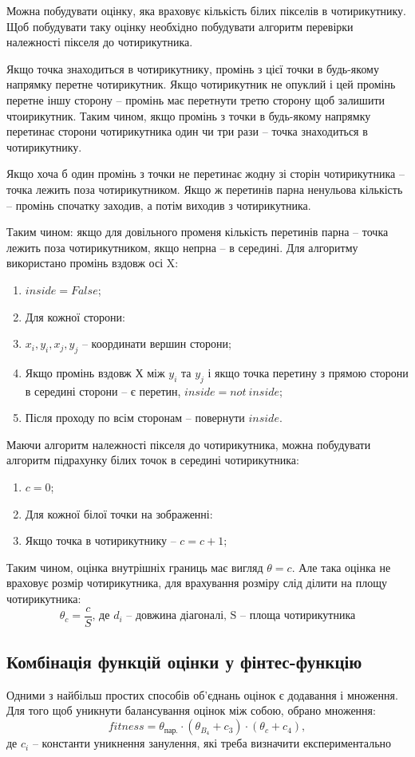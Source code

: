 \documentclass[a4paper,14pt]{report}
\begin{document}
Можна побудувати оцінку, яка враховує кількість білих пікселів в чотирикутнику. Щоб побудувати таку оцінку необхідно побудувати алгоритм перевірки належності пікселя до чотирикутника.

Якщо точка знаходиться в чотирикутнику, промінь з цієї точки в будь-якому напрямку перетне чотирикутник. Якщо чотирикутник не опуклий і цей промінь перетне іншу сторону -- промінь має перетнути третю сторону щоб залишити чтоирикутник.
Таким чином, якщо промінь з точки в будь-якому напрямку перетинає сторони чотирикутника один чи три рази -- точка знаходиться в чотирикутнику.

Якщо хоча б один промінь з точки не перетинає жодну зі сторін чотирикутника -- точка лежить поза чотирикутником. Якщо ж перетинів парна ненульова кількість -- промінь спочатку заходив, а потім виходив з чотирикутника.

Таким чином: якщо для довільного променя кількість перетинів парна -- точка лежить поза чотирикутником, якщо непрна -- в середині. Для алгоритму використано промінь вздовж осі X:
\begin{enumerate}
  \item $inside = False$;
  \item Для кожної сторони:
  \item $x_i, y_i, x_j, y_j$ -- координати вершин сторони;
  \item Якщо промінь вздовж Х між $y_i$ та $y_j$ і якщо точка перетину з прямою сторони в середині сторони -- є перетин, $inside = not\ inside$;
  \item Після проходу по всім сторонам -- повернути $inside$.
\end{enumerate}

Маючи алгоритм належності пікселя до чотирикутника, можна побудувати алгоритм підрахунку білих точок в середині чотирикутника:
\begin{enumerate}
  \item $c = 0$;
  \item Для кожної білої точки на зображенні:
  \item Якщо точка в чотирикутнику -- $c = c+1$;
\end{enumerate}

Таким чином, оцінка внутрішніх границь має вигляд $\theta = c$. 
Але така оцінка не враховує розмір чотирикутника, для врахування розміру слід ділити на площу чотирикутника:
\[
\theta_c = \frac{c}{S}\text{, де $d_i$ -- довжина діагоналі, S -- площа чотирикутника}
\]

\subsection{Комбінація функцій оцінки у фінтес-функцію}
Одними з найбільш простих способів об'єднань оцінок є додавання і множення. 
Для того щоб уникнути балансування оцінок між собою, обрано множення:
\[
fitness = \theta_\text{пар.}\cdot (\theta_{B_4}+c_3)\cdot (\theta_c + c_4),
\]
де $c_i$ -- константи уникнення занулення, які треба визначити експериментально
\end{document}
